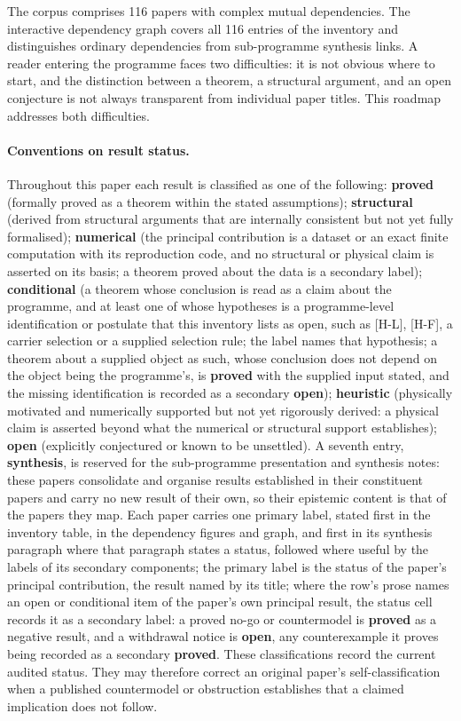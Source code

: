 \documentclass[11pt,a4paper]{article}
\newcommand{\sproved}{\textcolor{cproved}{\textbf{proved}}}
\newcommand{\sstruct}{\textcolor{cstruct}{\textbf{structural}}}
\newcommand{\sheur}{\textcolor{cheur}{\textbf{heuristic}}}
\newcommand{\sopen}{\textcolor{copen}{\textbf{open}}}
\newcommand{\ssynth}{\textcolor{csynth}{\textbf{synthesis}}}
\newcommand{\snum}{\textcolor{cnum}{\textbf{numerical}}}
\newcommand{\scond}{\textcolor{ccond}{\textbf{conditional}}}
\begin{document}
  The corpus comprises 116 papers with complex mutual dependencies.
  The interactive dependency graph covers all 116 entries of the inventory and distinguishes
  ordinary dependencies from sub-programme synthesis links.
  A reader entering the programme faces two difficulties: it is not obvious where to start,
  and the distinction between a theorem, a structural argument, and an open conjecture is not always
  transparent from individual paper titles.
  This roadmap addresses both difficulties.

  \paragraph{Conventions on result status.}
    Throughout this paper each result is classified as one of the following:
    \sproved{} (formally proved as a theorem within the stated assumptions);
    \sstruct{} (derived from structural arguments that are internally consistent but not yet fully
    formalised);
    \snum{} (the principal contribution is a dataset or an exact finite computation with its reproduction
    code, and no structural or physical claim is asserted on its basis; a theorem proved about the data is a
    secondary label);
    \scond{} (a theorem whose conclusion is read as a claim about the programme, and at least one of whose
    hypotheses is a programme-level identification or postulate that this inventory lists as open, such as
    [H-L], [H-F], a carrier selection or a supplied selection rule; the label names that hypothesis; a
    theorem about a supplied object as such, whose conclusion does not depend on the object being the
    programme's, is \sproved{} with the supplied input stated, and the missing identification is recorded as
    a secondary \sopen{});
    \sheur{} (physically motivated and numerically supported but not yet rigorously derived: a physical
    claim is asserted beyond what the numerical or structural support establishes);
    \sopen{} (explicitly conjectured or known to be unsettled).
    A seventh entry, \ssynth{}, is reserved for the sub-programme presentation
    and synthesis notes: these papers consolidate and organise results established in their
    constituent papers and carry no new result of their own, so their epistemic content is that of
    the papers they map.
    Each paper carries one primary label, stated first in the inventory table, in the dependency figures
    and graph, and first in its synthesis paragraph where that paragraph states a status, followed where
    useful by the labels of its secondary components; the primary label is the status of the paper's
    principal contribution, the result named by its title; where the row's prose names an open or conditional
    item of the paper's own principal result, the status cell records it as a secondary label: a proved no-go or
    countermodel is \sproved{} as a
    negative result, and a withdrawal notice is \sopen{}, any counterexample it proves being recorded as a
    secondary \sproved{}.
    These classifications record the current audited status.
    They may therefore correct an original paper's self-classification when a published countermodel or
    obstruction establishes that a claimed implication does not follow.
\end{document}
